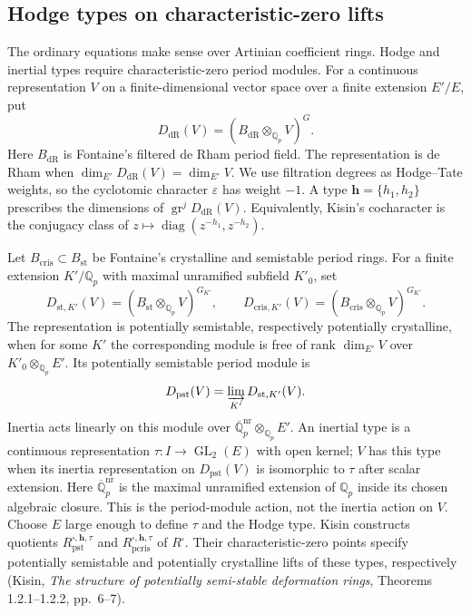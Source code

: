 \subsection{Hodge types on characteristic-zero lifts}

The ordinary equations make sense over Artinian coefficient rings.
Hodge and inertial types require characteristic-zero period modules.
For a continuous representation $V$ on a finite-dimensional vector
space over a finite extension $E'/E$, put
\[
 D_{\mathrm{dR}}(V)
   =(B_{\mathrm{dR}}\otimes_{\mathbb Q_p}V)^G.
\]
Here $B_{\mathrm{dR}}$ is Fontaine's filtered de Rham period field.
The representation is de Rham when
$\dim_{E'}D_{\mathrm{dR}}(V)=\dim_{E'}V$.
We use filtration degrees as Hodge--Tate weights, so the cyclotomic
character $\varepsilon$ has weight $-1$.
A type $\mathbf h=\{h_1,h_2\}$ prescribes the dimensions of
$\operatorname{gr}^jD_{\mathrm{dR}}(V)$.
Equivalently, Kisin's cocharacter is the conjugacy class of
$z\mapsto\operatorname{diag}(z^{-h_1},z^{-h_2})$.

Let $B_{\mathrm{cris}}\subset B_{\mathrm{st}}$ be Fontaine's
crystalline and semistable period rings. For a finite extension
$K'/\mathbb Q_p$ with maximal unramified subfield $K'_0$, set
\[
 D_{\mathrm{st},K'}(V)=(B_{\mathrm{st}}\otimes_{\mathbb Q_p}V)^{G_{K'}},
 \qquad
 D_{\mathrm{cris},K'}(V)=(B_{\mathrm{cris}}\otimes_{\mathbb Q_p}V)^{G_{K'}}.
\]
The representation is potentially semistable, respectively potentially
crystalline, when for some $K'$ the corresponding module is free of
rank $\dim_{E'}V$ over $K'_0\otimes_{\mathbb Q_p}E'$.
Its potentially semistable period module is
\[
 D_{\mathrm{pst}}(V)=\varinjlim_{K'}D_{\mathrm{st},K'}(V).
\]
Inertia acts linearly on this module over
$\overline{\mathbb Q}_p^{\mathrm{nr}}\otimes_{\mathbb Q_p}E'$.
An inertial type is a continuous representation
$\tau:I\to\operatorname{GL}_2(E)$ with open kernel; $V$ has this
type when its inertia representation on $D_{\mathrm{pst}}(V)$
is isomorphic to $\tau$ after scalar extension. Here
$\overline{\mathbb Q}_p^{\mathrm{nr}}$ is the maximal unramified
extension of $\mathbb Q_p$ inside its chosen algebraic closure.
This is the period-module action, not the inertia action on $V$.
Choose $E$ large enough to define $\tau$ and the Hodge type.
Kisin constructs quotients $R^{\square,\mathbf h,\tau}_{\mathrm{pst}}$
and $R^{\square,\mathbf h,\tau}_{\mathrm{pcris}}$ of $R^\square$.
Their characteristic-zero points specify potentially semistable and
potentially crystalline lifts of these types, respectively
(Kisin, \emph{The structure of potentially semi-stable deformation rings}, Theorems 1.2.1--1.2.2, pp.~6--7).

